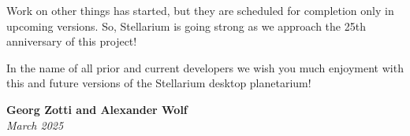 Work on other things has started, but they are scheduled for completion only in upcoming versions. 
So, Stellarium is going strong as we approach the  25th anniversary of this project!


In the name of all prior and current developers we wish you much enjoyment with
this and future versions of the Stellarium desktop planetarium!

\begin{flushright}
\textbf{Georg Zotti and Alexander Wolf} \\ \emph{March 2025}
\end{flushright}

\vspace{2\baselineskip}




